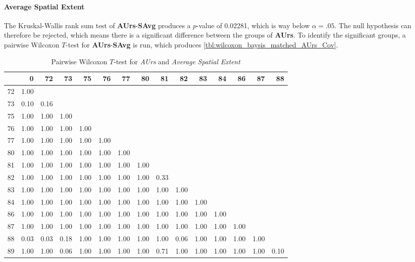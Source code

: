 \paragraph{Average Spatial Extent}
The Kruskal-Wallis rank sum test of \textbf{AUrs}-\textbf{SAvg} produces a $p$-value of 0.02281, which is way below $\alpha=.05$. The null hypothesis can therefore be rejected, which means there is a significant difference between the groups of \textbf{AUrs}. To identify the significant groups, a pairwise Wilcoxon $T$-test for \textbf{AUrs}-\textbf{SAvg} is run, which produces \cref{tbl:wilcoxon_baysis_matched_AUrs_Cov}.
\begin{table}[ht]
	\tiny
	\centering
	\begin{tabular}{rrrrrrrrrrrrrrr}
		\toprule
		& 0 & 72 & 73 & 75 & 76 & 77 & 80 & 81 & 82 & 83 & 84 & 86 & 87 & 88 \\ 
		\midrule
		72 & 1.00 &  &  &  &  &  &  &  &  &  &  &  &  &  \\ 
		73 & 0.10 & 0.16 &  &  &  &  &  &  &  &  &  &  &  &  \\ 
		75 & 1.00 & 1.00 & 1.00 &  &  &  &  &  &  &  &  &  &  &  \\ 
		76 & 1.00 & 1.00 & 1.00 & 1.00 &  &  &  &  &  &  &  &  &  &  \\ 
		77 & 1.00 & 1.00 & 1.00 & 1.00 & 1.00 &  &  &  &  &  &  &  &  &  \\ 
		80 & 1.00 & 1.00 & 1.00 & 1.00 & 1.00 & 1.00 &  &  &  &  &  &  &  &  \\ 
		81 & 1.00 & 1.00 & 1.00 & 1.00 & 1.00 & 1.00 & 1.00 &  &  &  &  &  &  &  \\ 
		82 & 1.00 & 1.00 & 1.00 & 1.00 & 1.00 & 1.00 & 1.00 & 0.33 &  &  &  &  &  &  \\ 
		83 & 1.00 & 1.00 & 1.00 & 1.00 & 1.00 & 1.00 & 1.00 & 1.00 & 1.00 &  &  &  &  &  \\ 
		84 & 1.00 & 1.00 & 1.00 & 1.00 & 1.00 & 1.00 & 1.00 & 1.00 & 1.00 & 1.00 &  &  &  &  \\ 
		86 & 1.00 & 1.00 & 1.00 & 1.00 & 1.00 & 1.00 & 1.00 & 1.00 & 1.00 & 1.00 & 1.00 &  &  &  \\ 
		87 & 1.00 & 1.00 & 1.00 & 1.00 & 1.00 & 1.00 & 1.00 & 1.00 & 1.00 & 1.00 & 1.00 & 1.00 &  &  \\ 
		88 & 0.03 & 0.03 & 0.18 & 1.00 & 1.00 & 1.00 & 1.00 & 1.00 & 0.06 & 1.00 & 1.00 & 1.00 & 1.00 &  \\ 
		89 & 1.00 & 1.00 & 0.06 & 1.00 & 1.00 & 1.00 & 1.00 & 0.71 & 1.00 & 1.00 & 1.00 & 1.00 & 1.00 & 0.10 \\ 
		\bottomrule
	\end{tabular}
	\caption{Pairwise Wilcoxon $T$-test for \textit{AUrs} and \textit{Average Spatial Extent}}
	\label{tbl:wilcoxon_baysis_matched_AUrs_SAvg}
\end{table}
